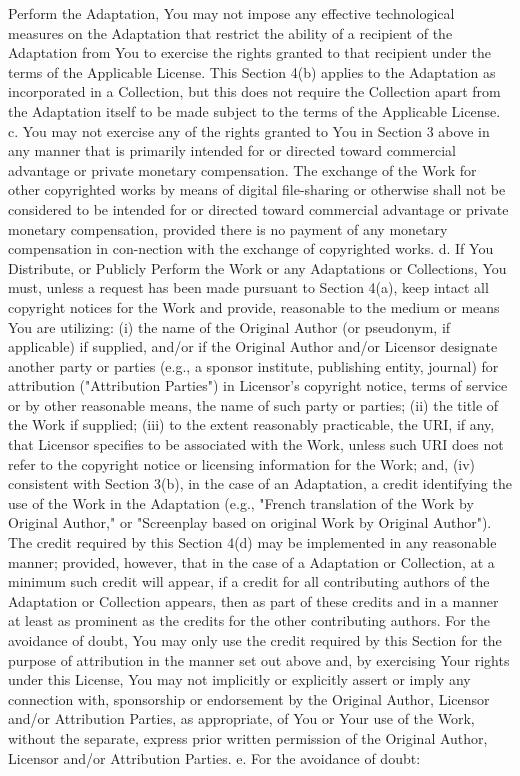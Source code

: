     Perform the Adaptation, You may not impose any effective technological
    measures on the Adaptation that restrict the ability of a recipient of
    the Adaptation from You to exercise the rights granted to that
    recipient under the terms of the Applicable License. This Section 4(b)
    applies to the Adaptation as incorporated in a Collection, but this
    does not require the Collection apart from the Adaptation itself to be
    made subject to the terms of the Applicable License.
 c. You may not exercise any of the rights granted to You in Section 3
    above in any manner that is primarily intended for or directed toward
    commercial advantage or private monetary compensation. The exchange of
    the Work for other copyrighted works by means of digital file-sharing
    or otherwise shall not be considered to be intended for or directed
    toward commercial advantage or private monetary compensation, provided
    there is no payment of any monetary compensation in con-nection with
    the exchange of copyrighted works.
 d. If You Distribute, or Publicly Perform the Work or any Adaptations or
    Collections, You must, unless a request has been made pursuant to
    Section 4(a), keep intact all copyright notices for the Work and
    provide, reasonable to the medium or means You are utilizing: (i) the
    name of the Original Author (or pseudonym, if applicable) if supplied,
    and/or if the Original Author and/or Licensor designate another party
    or parties (e.g., a sponsor institute, publishing entity, journal) for
    attribution ("Attribution Parties") in Licensor's copyright notice,
    terms of service or by other reasonable means, the name of such party
    or parties; (ii) the title of the Work if supplied; (iii) to the
    extent reasonably practicable, the URI, if any, that Licensor
    specifies to be associated with the Work, unless such URI does not
    refer to the copyright notice or licensing information for the Work;
    and, (iv) consistent with Section 3(b), in the case of an Adaptation,
    a credit identifying the use of the Work in the Adaptation (e.g.,
    "French translation of the Work by Original Author," or "Screenplay
    based on original Work by Original Author"). The credit required by
    this Section 4(d) may be implemented in any reasonable manner;
    provided, however, that in the case of a Adaptation or Collection, at
    a minimum such credit will appear, if a credit for all contributing
    authors of the Adaptation or Collection appears, then as part of these
    credits and in a manner at least as prominent as the credits for the
    other contributing authors. For the avoidance of doubt, You may only
    use the credit required by this Section for the purpose of attribution
    in the manner set out above and, by exercising Your rights under this
    License, You may not implicitly or explicitly assert or imply any
    connection with, sponsorship or endorsement by the Original Author,
    Licensor and/or Attribution Parties, as appropriate, of You or Your
    use of the Work, without the separate, express prior written
    permission of the Original Author, Licensor and/or Attribution
    Parties.
 e. For the avoidance of doubt:

